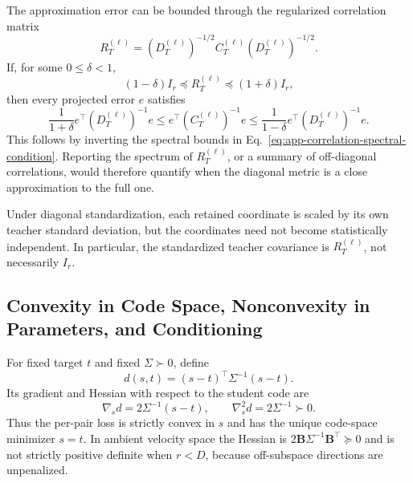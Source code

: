 \documentclass{article}
\newcommand{\bB}{\boldsymbol{B}}
\newcommand{\bSigma}{\varSigma}
\newcommand{\bI}{I}
\theoremstyle{plain}
\theoremstyle{definition}
\theoremstyle{remark}
\begin{document}
The approximation error can be bounded through the regularized correlation matrix
\begin{equation}
  R_T^{(\ell)}=(D_T^{(\ell)})^{-1/2}
  C_T^{(\ell)}(D_T^{(\ell)})^{-1/2}.
  \label{eq:app-correlation-matrix}
\end{equation}
If, for some $0\le\delta<1$,
\begin{equation}
  (1-\delta)\bI_r\preceq R_T^{(\ell)}
  \preceq(1+\delta)\bI_r,
  \label{eq:app-correlation-spectral-condition}
\end{equation}
then every projected error $e$ satisfies
\begin{equation}
  \frac{1}{1+\delta}e^\top(D_T^{(\ell)})^{-1}e
  \le e^\top(C_T^{(\ell)})^{-1}e
  \le\frac{1}{1-\delta}e^\top(D_T^{(\ell)})^{-1}e.
  \label{eq:app-diag-full-bound}
\end{equation}
This follows by inverting the spectral bounds in
Eq.~\eqref{eq:app-correlation-spectral-condition}.  Reporting the spectrum of
$R_T^{(\ell)}$, or a summary of off-diagonal correlations, would therefore quantify
when the diagonal metric is a close approximation to the full one.

Under diagonal standardization, each retained coordinate is scaled by its own
teacher standard deviation, but the coordinates need not become statistically
independent.  In particular, the standardized teacher covariance is
$R_T^{(\ell)}$, not necessarily $\bI_r$.

\subsection{Convexity in Code Space, Nonconvexity in Parameters, and Conditioning}
\label{app:convexity-conditioning}

For fixed target $t$ and fixed $\bSigma\succ0$, define
\begin{equation}
  d(s,t)=(s-t)^\top\bSigma^{-1}(s-t).
  \label{eq:app-code-quadratic}
\end{equation}
Its gradient and Hessian with respect to the student code are
\begin{equation}
  \nabla_s d=2\bSigma^{-1}(s-t),
  \qquad
  \nabla_s^2d=2\bSigma^{-1}\succ0.
  \label{eq:app-code-gradient-hessian}
\end{equation}
Thus the per-pair loss is strictly convex in $s$ and has the unique code-space
minimizer $s=t$.  In ambient velocity space the Hessian is
$2\bB\bSigma^{-1}\bB^\top\succeq0$ and is not strictly positive definite when
$r<D$, because off-subspace directions are unpenalized.
\end{document}
